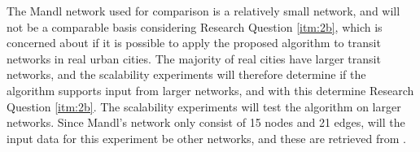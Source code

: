 The Mandl network used for comparison is a relatively small network, and will not be a comparable basis considering Research Question \vref{itm:2b}, which is concerned about if it is possible to apply the proposed algorithm to transit networks in real urban cities. The majority of real cities have larger transit networks, and the scalability experiments will therefore determine if the algorithm supports input from larger networks, and with this determine Research Question \vref{itm:2b}. The scalability experiments will test the algorithm on larger networks. Since Mandl's network only consist of 15 nodes and 21 edges, will the input data for this experiment be other networks, and these are retrieved from \citet{mumford13}.


